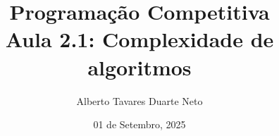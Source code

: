 \documentclass{beamer}
\title{{\Large Programação Competitiva}\\ Aula 2.1: Complexidade de algoritmos}
\date{01 de Setembro, 2025}
\author{Alberto Tavares Duarte Neto}
\institute{Universidade de Brasília}
\numberwithin{equation}{subsection}
\begin{document}
    \maketitle
    \small

    

    
    
    
    
    
    
    

\end{document}
